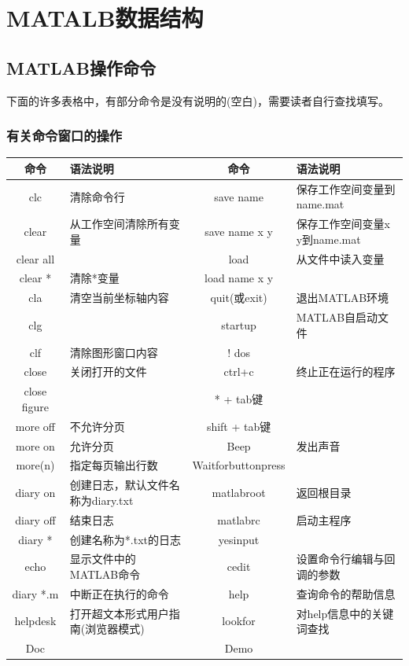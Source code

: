 \chapter{MATALB数据结构}
\section{MATLAB操作命令}
    \par
    下面的许多表格中，有部分命令是没有说明的(空白)，需要读者自行查找填写。
    \subsection{有关命令窗口的操作}
        \begin{table}[H]
        \begin{tabularx}{\textwidth}{cXcX}%
            \toprule
            命令 & 语法说明 & 命令 &语法说明\\
            \midrule
            clc & 清除命令行 & save name & 保存工作空间变量到name.mat\\
            clear & 从工作空间清除所有变量 &save name x y & 保存工作空间变量x y到name.mat\\
            clear all  & {} & load & 从文件中读入变量 \\
            clear * & 清除*变量 & load name x y & {}\\
            cla & 清空当前坐标轴内容 & quit(或exit) & 退出MATLAB环境 \\
            clg & {}& startup & MATLAB自启动文件 \\
            clf & 清除图形窗口内容 & ! dos & {} \\
            close & 关闭打开的文件 & ctrl+c&终止正在运行的程序 \\
            close figure & {}& * + tab键 & {} \\
            more off & 不允许分页 & shift + tab键 & {} \\
            more on & 允许分页 & Beep & 发出声音\\
            more(n) & 指定每页输出行数 & Waitforbuttonpress & {}\\
            diary on&创建日志，默认文件名称为diary.txt & matlabroot&返回根目录\\
            diary off&结束日志&matlabrc & 启动主程序 \\
            diary *&创建名称为*.txt的日志 & yesinput & {}\\
            echo&显示文件中的MATLAB命令 & cedit & 设置命令行编辑与回调的参数\\
            diary *.m & 中断正在执行的命令 &help & 查询命令的帮助信息\\
            helpdesk & 打开超文本形式用户指南(浏览器模式)& lookfor & 对help信息中的关键词查找\\
            Doc & {} & Demo & {} \\
            \bottomrule
        \end{tabularx}
        \end{table}
